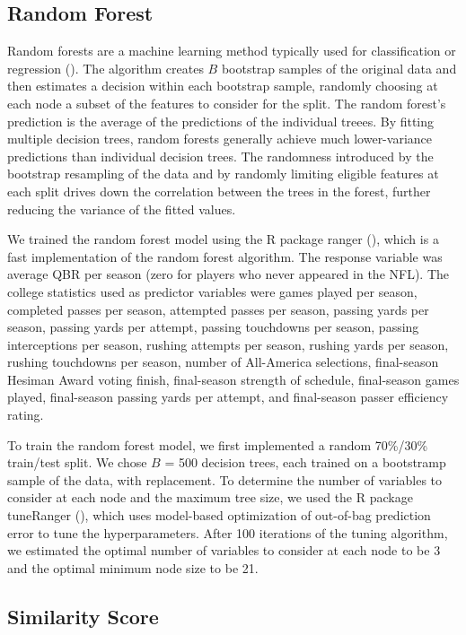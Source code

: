 \documentclass{article}
\begin{document}
\subsection{Random Forest}

Random forests are a machine learning method typically used for classification or regression (\cite{breiman_random_2001}). The algorithm creates $B$ bootstrap samples of the original data and then estimates a decision within each bootstrap sample, randomly choosing at each node a subset of the features to consider for the split. The random forest's prediction is the average of the predictions of the individual treees. By fitting multiple decision trees, random forests generally achieve much lower-variance predictions than individual decision trees. The randomness introduced by the bootstrap resampling of the data and by randomly limiting eligible features at each split drives down the correlation between the trees in the forest, further reducing the variance of the fitted values.

We trained the random forest model using the R package ranger (\cite{wright_ranger_2015}), which is a fast implementation of the random forest algorithm. The response variable was average QBR per season (zero for players who never appeared in the NFL). The college statistics used as predictor variables were games played per season, completed passes per season, attempted passes per season, passing yards per season, passing yards per attempt, passing touchdowns per season, passing interceptions per season, rushing attempts per season, rushing yards per season, rushing touchdowns per season, number of All-America selections, final-season Hesiman Award voting finish, final-season strength of schedule, final-season games played, final-season passing yards per attempt, and final-season passer efficiency rating.

To train the random forest model, we first implemented a random 70\%/30\% train/test split. We chose $B$ = 500 decision trees, each trained on a bootstramp sample of the data, with replacement. To determine the number of variables to consider at each node and the maximum tree size, we used the R package tuneRanger (\cite{probst_tuneranger_2018}), which uses model-based optimization of out-of-bag prediction error to tune the hyperparameters. After 100 iterations of the tuning algorithm, we estimated the optimal number of variables to consider at each node to be 3 and the optimal minimum node size to be 21.

\subsection{Similarity Score}
\end{document}
